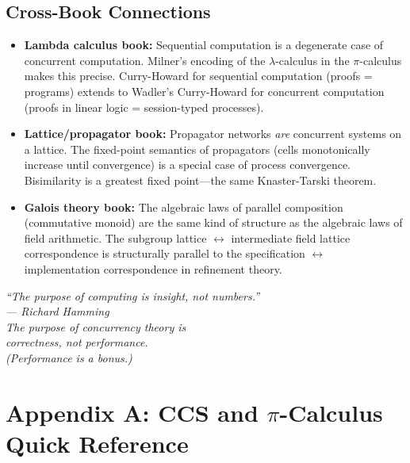\documentclass[11pt, a4paper, oneside]{book}
\begin{document}
\section{Cross-Book Connections}

\begin{itemize}[nosep]
\item \textbf{Lambda calculus book:} Sequential computation is a degenerate
  case of concurrent computation. Milner's encoding of the $\lambda$-calculus
  in the $\pi$-calculus makes this precise. Curry-Howard for sequential
  computation (proofs = programs) extends to Wadler's Curry-Howard for
  concurrent computation (proofs in linear logic = session-typed processes).
\item \textbf{Lattice/propagator book:} Propagator networks \emph{are}
  concurrent systems on a lattice. The fixed-point semantics of propagators
  (cells monotonically increase until convergence) is a special case of
  process convergence. Bisimilarity is a greatest fixed point---the same
  Knaster-Tarski theorem.
\item \textbf{Galois theory book:} The algebraic laws of parallel composition
  (commutative monoid) are the same kind of structure as the algebraic laws
  of field arithmetic. The subgroup lattice $\leftrightarrow$ intermediate
  field lattice correspondence is structurally parallel to the
  specification $\leftrightarrow$ implementation correspondence in
  refinement theory.
\end{itemize}

\vfill
\begin{center}
\Large\itshape\color{deepblue}
``The purpose of computing is insight, not numbers.''\\[0.5cm]
\normalsize --- Richard Hamming\\[0.3cm]
\normalsize The purpose of concurrency theory is\\
correctness, not performance.\\
(Performance is a bonus.)
\end{center}
\vfill

\backmatter

\chapter*{Appendix A: CCS and $\pi$-Calculus Quick Reference}
\end{document}
